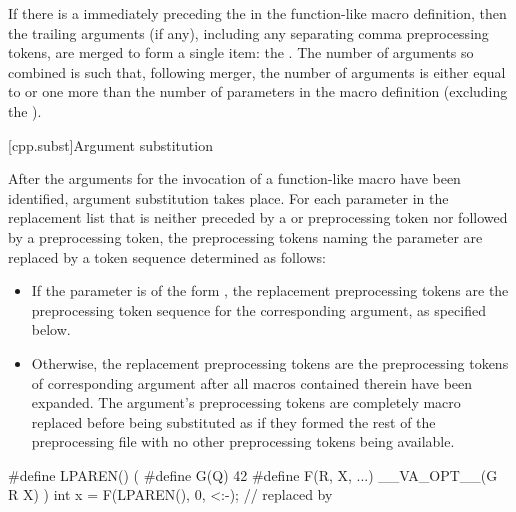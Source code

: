 \pnum
{}%
If there is a  immediately preceding the \tcode{)} in the
function-like macro
definition, then the trailing arguments (if any), including any separating comma preprocessing
tokens, are merged to form a single item: the . The number of
arguments so combined is such that, following merger, the number of arguments is
either equal to or
one more than the number of parameters in the macro definition (excluding the
).

[cpp.subst]{Argument substitution}%
%
%

%
\begin{bnf}
\br
      \terminal{)}
\end{bnf}

\pnum
After the arguments for the invocation of a function-like macro have
been identified, argument substitution takes place.
For each parameter in the replacement list that is neither
preceded by a \tcode{\#} or \tcode{\#\#} preprocessing token nor
followed by a \tcode{\#\#} preprocessing token, the preprocessing tokens
naming the parameter are replaced by a token sequence determined as follows:
\begin{itemize}
\item
  If the parameter is of the form ,
  the replacement preprocessing tokens are the
  preprocessing token sequence for the corresponding argument,
  as specified below.
\item
  Otherwise, the replacement preprocessing tokens are the
  preprocessing tokens of corresponding argument after all
  macros contained therein have been expanded. The argument's
  preprocessing tokens are completely macro replaced before
  being substituted as if they formed the rest of the preprocessing
  file with no other preprocessing tokens being available.
\end{itemize}
\begin{example}
\begin{codeblock}
#define LPAREN() (
#define G(Q) 42
#define F(R, X, ...)  __VA_OPT__(G R X) )
int x = F(LPAREN(), 0, <:-);    // replaced by 
\end{codeblock}
\end{example}

